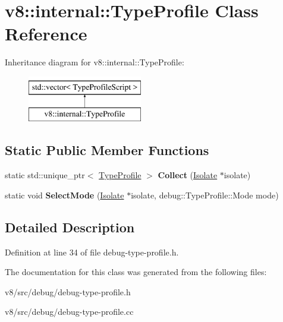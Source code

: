 \hypertarget{classv8_1_1internal_1_1TypeProfile}{}\section{v8\+:\+:internal\+:\+:Type\+Profile Class Reference}
\label{classv8_1_1internal_1_1TypeProfile}
Inheritance diagram for v8\+:\+:internal\+:\+:Type\+Profile\+:\begin{figure}[H]
\begin{center}
\leavevmode
\includegraphics[height=2.000000cm]{classv8_1_1internal_1_1TypeProfile}
\end{center}
\end{figure}
\subsection*{Static Public Member Functions}
\begin{DoxyCompactItemize}
\item 
\mbox{\label{classv8_1_1internal_1_1TypeProfile_a6a9f0bd367fa77aee9b1129d0534a198}} 
static std\+::unique\+\_\+ptr$<$ \mbox{\hyperlink{classv8_1_1internal_1_1TypeProfile}{Type\+Profile}} $>$ {\bfseries Collect} (\mbox{\hyperlink{classv8_1_1internal_1_1Isolate}{Isolate}} $\ast$isolate)
\item 
\mbox{\label{classv8_1_1internal_1_1TypeProfile_ac457f0163b769ec2363a3178c6571ef4}} 
static void {\bfseries Select\+Mode} (\mbox{\hyperlink{classv8_1_1internal_1_1Isolate}{Isolate}} $\ast$isolate, debug\+::\+Type\+Profile\+::\+Mode mode)
\end{DoxyCompactItemize}


\subsection{Detailed Description}


Definition at line 34 of file debug-\/type-\/profile.\+h.



The documentation for this class was generated from the following files\+:\begin{DoxyCompactItemize}
\item 
v8/src/debug/debug-\/type-\/profile.\+h\item 
v8/src/debug/debug-\/type-\/profile.\+cc\end{DoxyCompactItemize}
